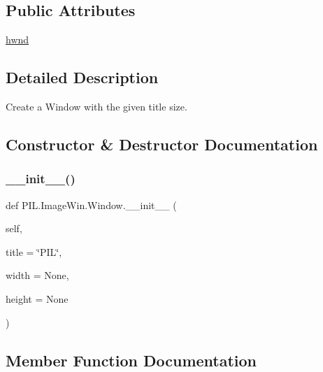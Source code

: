 \subsection*{Public Attributes}
\begin{DoxyCompactItemize}
\item 
\hyperlink{classPIL_1_1ImageWin_1_1Window_a61e2885c93c2274b34379b2c2995bbb8}{hwnd}
\end{DoxyCompactItemize}


\subsection{Detailed Description}
\begin{DoxyVerb}Create a Window with the given title size.\end{DoxyVerb}
 

\subsection{Constructor \& Destructor Documentation}
\mbox{\label{classPIL_1_1ImageWin_1_1Window_a0fc79a05d8d0792ce1807e8876f6d315}} 
\subsubsection{\texorpdfstring{\+\_\+\+\_\+init\+\_\+\+\_\+()}{\_\_init\_\_()}}
{\footnotesize\ttfamily def P\+I\+L.\+Image\+Win.\+Window.\+\_\+\+\_\+init\+\_\+\+\_\+ (\begin{DoxyParamCaption}\item[{}]{self,  }\item[{}]{title = {\ttfamily \char`\"{}PIL\char`\"{}},  }\item[{}]{width = {\ttfamily None},  }\item[{}]{height = {\ttfamily None} }\end{DoxyParamCaption})}



\subsection{Member Function Documentation}
\mbox{\label{classPIL_1_1ImageWin_1_1Window_a7204bd1ab1a17babf4ffe45a3033615e}} 
